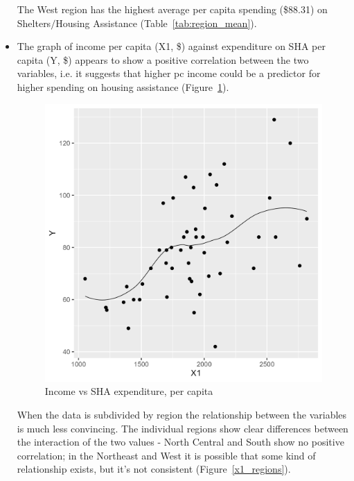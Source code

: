 \documentclass[12pt,letterpaper]{article}
\begin{document}
\begin{itemize}
    

    The West region has the highest average per capita spending (\$88.31) on Shelters$/$Housing Assistance
    (Table~\ref{tab:region_mean}).

		
		\vspace{.5cm}

		\item
    The graph of income per capita (X1, \$) against expenditure on SHA per capita (Y, \$) appears
    to show a positive correlation between the two variables, i.e. it suggests that higher
    pc income could be a predictor for higher spending on housing assistance (Figure~\ref{y_x1}).

    \begin{figure}
      \includegraphics[width=16cm]{y_x1.png}
      \caption{Income vs SHA expenditure, per capita}\label{y_x1}
    \end{figure}


    When the data is subdivided by region the relationship between the variables is much less
    convincing.  The individual regions show clear differences between the interaction of the 
    two values - North Central and South show no positive correlation; in the Northeast and West
    it is possible that some kind of relationship exists, but it's not consistent
    (Figure~\ref{x1_regions}).
    

\end{itemize}
\end{document}
